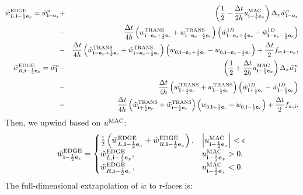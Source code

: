 \documentclass[11pt]{article}
\def\half  {\frac{1}{2}}
\def\dt    {\Delta t}
\def\edge  {\rm EDGE}
\def\mac   {\rm MAC}
\def\trans {\rm TRANS}
\def\eb    {{\bf e}}
\def\ib    {{\bf i}}
\def\wt    {\tilde{w}}
\begin{document}
\begin{eqnarray}
\wt_{L,\ib-\half\eb_x}^{\edge} = \wt_{\ib-\eb_x}^n &+& \left(\half - \frac{\dt}{2h}u_{\ib-\half\eb_x}^{\mac}\right)\Delta_x \wt_{\ib-\eb_x}^n \nonumber \\
&-& \frac{\dt}{4h}\left(w_{\ib-\eb_x+\half\eb_r}^{\trans}+w_{\ib-\eb_x-\half\eb_r}^{\trans}\right)\left(\wt_{\ib-\eb_x+\half\eb_r}^{1D} - \wt_{\ib-\eb_x-\half\eb_r}^{1D}\right) \nonumber \\
&-& \frac{\dt}{4h}\left(\wt_{\ib-\eb_x+\half\eb_r}^{\trans}+\wt_{\ib-\eb_x-\half\eb_r}^{\trans}\right)\left(w_{0,\ib-\eb_x+\half\eb_r}-w_{0,\ib-\eb_x-\half\eb_r}\right) + \frac{\dt}{2}f_{w,\ib-\eb_x}, \label{wt_L x-edge} \\
\wt_{R,\ib-\half\eb_x}^{\edge} = \wt_{\ib}^n &-& \left(\half + \frac{\dt}{2h}u_{\ib-\half\eb_x}^{\mac}\right)\Delta_x \wt_{\ib}^n \nonumber \\
&-& \frac{\dt}{4h}\left(w_{\ib+\half\eb_r}^{\trans}+w_{\ib-\half\eb_r}^{\trans}\right)\left(\wt_{\ib+\half\eb_r}^{1D} - \wt_{\ib-\half\eb_r}^{1D}\right) \nonumber \\
&-& \frac{\dt}{4h}\left(\wt_{\ib+\half\eb_r}^{\trans}+\wt_{\ib-\half\eb_r}^{\trans}\right)\left(w_{0,\ib+\half\eb_r}-w_{0,\ib-\half\eb_r}\right) + \frac{\dt}{2}f_{w,\ib}. \label{wt_R x-edge}
\end{eqnarray}
Then, we upwind based on $u^{\mac}$:
\begin{equation}
\wt_{\ib-\half\eb_x}^{\edge} =
\begin{cases}
\half\left(\wt_{L,\ib-\half\eb_x}^{\edge} + \wt_{R,\ib-\half\eb_x}^{\edge}\right), & \left|u^{\mac}_{\ib-\half\eb_x}\right| < \epsilon \\
\wt_{L,\ib-\half\eb_x}^{\edge}, & u^{\mac}_{\ib-\half\eb_x} > 0, \\
\wt_{R,\ib-\half\eb_x}^{\edge}, & u^{\mac}_{\ib-\half\eb_x} < 0.
\end{cases}
\end{equation}
The full-dimensional extrapolation of $\wt$ to r-faces is:
\end{document}
